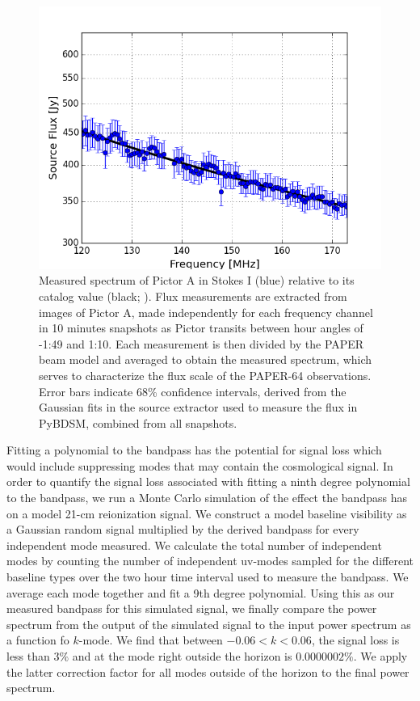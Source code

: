 \documentclass[twocolumn,numberedappendix]{emulateapj} \shorttitle{New Limits on the 21 cm Power Spectrum at $z=8.4$}
\begin{document}
\begin{figure}
\centering
\includegraphics[width=\columnwidth]{plots/picspec.png}
\caption{
Measured spectrum of Pictor A in Stokes I (blue) relative to its catalog
value (black; \citealt{jacobs_et_al2013}).  Flux measurements are
extracted from images of Pictor A, made independently for each frequency channel in
10 minutes snapshots as Pictor transits between hour angles of -1:49
and 1:10.  Each measurement is then divided by the PAPER beam model and
averaged to obtain the measured spectrum, which serves to characterize the flux
scale of the PAPER-64 observations. Error bars indicate 68\% confidence
intervals, derived from the Gaussian fits in the source extractor used to
measure the flux in PyBDSM, combined from all snapshots.
}\label{fig:pic_spec}
\end{figure}


Fitting a polynomial to the bandpass has the potential for signal loss which
would include suppressing modes that may contain the cosmological signal. In order to
quantify the signal loss associated with fitting a ninth degree polynomial to
the bandpass, we run a Monte Carlo simulation of the effect the bandpass has on
a model 21-cm reionization signal. We construct a model baseline visibility as a Gaussian
random signal 
multiplied by the derived bandpass for every independent mode measured. We
calculate the total number of independent modes by counting the number of
independent uv-modes sampled for the different baseline types over the two hour
time interval used to measure the bandpass. We average each mode together and
fit a 9th degree polynomial. Using this as our measured bandpass for this
simulated signal, we finally compare the power spectrum from the output of the
simulated signal to the input power spectrum as a function fo $k$-mode.  We
find that between $-0.06 < k < 0.06$, the signal loss is less than $3\%$ and at
the mode right outside the horizon is $0.0000002\%$. We apply the latter
correction factor for all modes outside of the horizon to the final power
spectrum.
\end{document}
